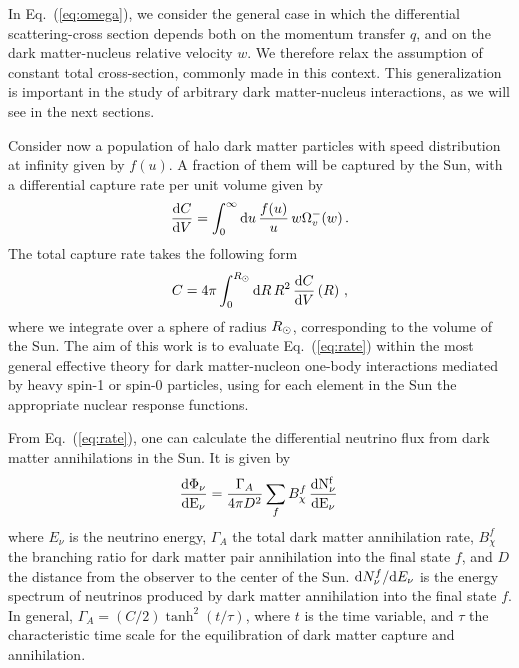 \documentclass[11pt,a4paper]{article}
\begin{document}
In Eq.~(\ref{eq:omega}), we consider the general case in which the differential scattering-cross section depends both on the momentum transfer $q$, and on the dark matter-nucleus relative velocity $w$. We therefore relax the assumption of constant total cross-section, commonly made in this context. This generalization is important in the study of arbitrary dark matter-nucleus interactions, as we will see in the next sections.

Consider now a population of halo dark matter particles with speed distribution at infinity given by $f(u)$. A fraction of them will be captured by the Sun, with a differential capture rate per unit volume given by~\cite{Gould:1987ir}
\begin{equation}
\frac{{\rm d} C}{{\rm d}V} = \int_{0}^{\infty} {\rm d}u\, \frac{f(u)}{u}\, w\Omega_{v}^{-}(w) \,.
\end{equation}
The total capture rate takes the following form
\begin{equation}
C = 4\pi \int_{0}^{R_{\odot}} {\rm d} R\, R^2\,\frac{{\rm d} C}{{\rm d}V} \left(R\right)\,,
\label{eq:rate}
\end{equation}
where we integrate over a sphere of radius $R_{\rm \odot}$, corresponding to the volume of the Sun. The aim of this work is to evaluate Eq.~(\ref{eq:rate}) within the most general effective theory for dark matter-nucleon one-body interactions mediated by heavy spin-1 or spin-0 particles, using for each element in the Sun the appropriate nuclear response functions.

From Eq.~(\ref{eq:rate}), one can calculate the differential neutrino flux from dark matter annihilations in the Sun. It is given by~\cite{Edsjo:1997hp}
\begin{equation}
\frac{{\rm d \Phi_\nu}}{{\rm d E_\nu}} = \frac{\Gamma_A}{4\pi D^2} \sum_{f} B_{\chi}^{f} \, \frac{{\rm d N_\nu^f}}{{\rm d E_\nu}} \,
\label{eq:nuflux}
\end{equation}
where $E_{\nu}$ is the neutrino energy, $\Gamma_A$ the total dark matter annihilation rate, $B_{\chi}^{f}$ the branching ratio for dark matter pair annihilation into the final state $f$, and $D$ the distance from the observer to the center of the Sun. ${\rm d} N_\nu^f/{\rm d} E_\nu$ is the energy spectrum of neutrinos produced by dark matter annihilation into the final state $f$. In general, $\Gamma_A = (C/2) \tanh^2(t/\tau)$, where $t$ is the time variable, and $\tau$ the characteristic time scale for the equilibration of dark matter capture and annihilation.
\end{document}
